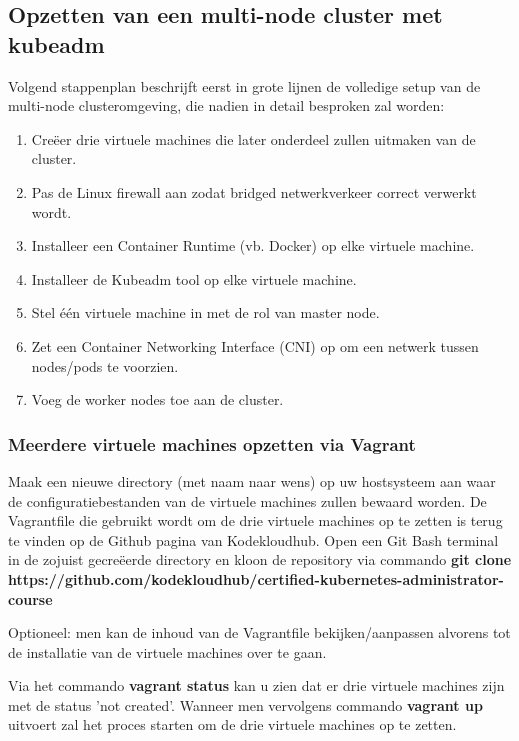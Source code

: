 \subsection{Opzetten van een multi-node cluster met kubeadm}

Volgend stappenplan beschrijft eerst in grote lijnen de volledige setup van de multi-node clusteromgeving, die nadien in detail besproken zal worden: 
\begin{enumerate}
    \item Creëer drie virtuele machines die later onderdeel zullen uitmaken van de cluster.
    \item Pas de Linux firewall aan zodat bridged netwerkverkeer correct verwerkt wordt.
    \item Installeer een Container Runtime (vb. Docker) op elke virtuele machine.   
    \item Installeer de Kubeadm tool op elke virtuele machine.
    \item Stel één virtuele machine in met de rol van master node.
    \item Zet een Container Networking Interface (CNI) op om een netwerk tussen nodes/pods te voorzien.
    \item Voeg de worker nodes toe aan de cluster.
\end{enumerate}

\subsubsection{Meerdere virtuele machines opzetten via Vagrant}

Maak een nieuwe directory (met naam naar wens) op uw hostsysteem aan waar de configuratiebestanden van de virtuele machines zullen bewaard worden. 
De Vagrantfile die gebruikt wordt om de drie virtuele machines op te zetten is terug te vinden op de Github pagina van Kodekloudhub. Open een Git Bash terminal in de zojuist gecreëerde directory en kloon de repository via commando {\bf git clone https://github.com/kodekloudhub/certified-kubernetes-administrator-course}

Optioneel: men kan de inhoud van de Vagrantfile bekijken/aanpassen alvorens tot de installatie van de virtuele machines over te gaan. 

Via het commando {\bf vagrant status} kan u zien dat er drie virtuele machines zijn met de status 'not created'. Wanneer men vervolgens commando {\bf vagrant up} uitvoert zal het proces starten om de drie virtuele machines op te zetten.

